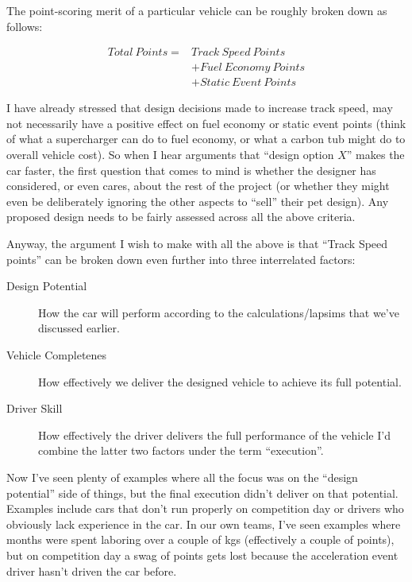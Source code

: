 \documentclass[10pt, a4paper, article, oneside, twocolumn, final]{memoir}
\begin{document}
The point-scoring merit of a particular vehicle can be roughly broken down as follows: 

\begin{equation*}
    \begin{aligned}
        Total\ Points = {} & Track\ Speed\ Points\\ 
                           & + Fuel\ Economy\ Points\\ 
                           & + Static\ Event\ Points
    \end{aligned}
\end{equation*}

I have already stressed that design decisions made to increase track speed, may not necessarily have a positive effect on fuel economy or static event points (think of what a supercharger can do to fuel economy, or what a carbon tub might do to overall vehicle cost). So when I hear arguments that “design option $X$” makes the car faster, the first question that comes to mind is whether the designer has considered, or even cares, about the rest of the project (or whether they might even be deliberately ignoring the other aspects to “sell” their pet design). Any proposed design needs to be fairly assessed across all the above criteria. 

Anyway, the argument I wish to make with all the above is that “Track Speed points” can be broken down even further into three interrelated factors: 

\begin{description}
    \item[Design Potential] How the car will perform according to the calculations/\allowbreak lapsims that we’ve discussed earlier.
    \item[Vehicle Completenes] How effectively we deliver the designed vehicle to achieve its full potential. 
    \item[Driver Skill] How effectively the driver delivers the full performance of the vehicle I’d combine the latter two factors under the term “execution”.
\end{description}

Now I’ve seen plenty of examples where all the focus was on the “design potential” side of things, but the final execution didn’t deliver on that potential. Examples include cars that don’t run properly on competition day or drivers who obviously lack experience in the car. In our own teams, I’ve seen examples where months were spent laboring over a couple of kgs (effectively a couple of points), but on competition day a swag of points gets lost because the acceleration event driver hasn’t driven the car before. 
\end{document}
